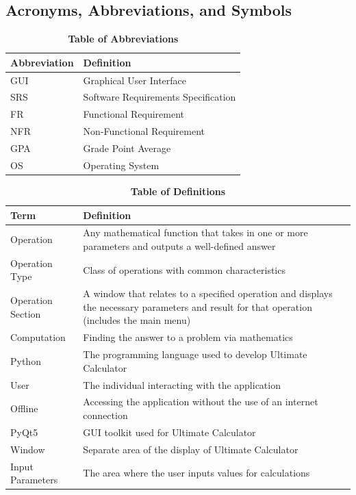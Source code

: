 \documentclass[12pt, titlepage]{article}
\begin{document}
\subsection{Acronyms, Abbreviations, and Symbols}

\begin{table}[H]
\caption{\textbf{Table of Abbreviations}} \label{Table}
\begin{tabularx}{\textwidth}{p{3cm}X}
\toprule
\textbf{Abbreviation} & \textbf{Definition} \\
\midrule
GUI & Graphical User Interface\\
SRS & Software Requirements Specification\\
FR & Functional Requirement\\
NFR & Non-Functional Requirement\\
GPA & Grade Point Average\\
OS & Operating System\\
\bottomrule
\end{tabularx}

\end{table}

\begin{table}[H]
\caption{\textbf{Table of Definitions}} \label{Table}

\begin{tabularx}{\textwidth}{p{3cm}X}
\toprule
\textbf{Term} & \textbf{Definition}\\
\midrule
Operation & Any mathematical function that takes in one or more parameters and
outputs a well-defined answer\\
Operation Type & Class of operations with common characteristics\\
Operation Section & A window that relates to a specified operation and displays the
necessary parameters and result for that operation (includes the main menu)\\
Computation & Finding the answer to a problem via mathematics\\
Python & The programming language used to develop Ultimate Calculator\\
User & The individual interacting with the application\\
Offline & Accessing the application without the use of an internet connection\\
PyQt5 & GUI toolkit used for Ultimate Calculator\\
Window & Separate area of the display of Ultimate Calculator\\
Input Parameters & The area where the user inputs values for calculations\\
\bottomrule
\end{tabularx}

\end{table}
\end{document}
